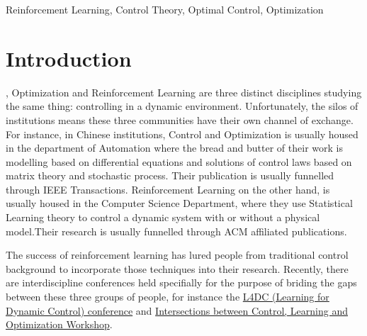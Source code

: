 \documentclass[journal]{IEEEtran}
\begin{document}
\begin{IEEEkeywords}
Reinforcement Learning, Control Theory, Optimal Control, Optimization
\end{IEEEkeywords}
%
\IEEEpeerreviewmaketitle


\section{Introduction}
, Optimization and Reinforcement Learning are three distinct disciplines studying the same thing: controlling in a dynamic environment. Unfortunately, the silos of institutions means these three communities have their own channel of exchange. For instance, in Chinese institutions, Control and Optimization is usually housed in the department of Automation where the bread and butter of their work is modelling based on differential equations and solutions of control laws based on matrix theory and stochastic process. Their publication is usually funnelled through IEEE Transactions. Reinforcement Learning on the other hand, is usually housed in the Computer Science Department, where they use Statistical Learning theory to control a dynamic system with or without a physical model.Their research is usually funnelled through ACM affiliated publications.

The success of reinforcement learning has lured people from traditional control background to incorporate those techniques into their research. Recently, there are interdiscipline conferences held specifially for the purpose of briding the gaps between these three groups of people, for instance the \href{https://l4dc.mit.edu/}{L4DC (Learning for Dynamic Control) conference} and \href{https://www.ipam.ucla.edu/programs/workshops/intersections-between-control-learning-and-optimization/}{Intersections between Control, Learning and Optimization Workshop}.
\end{document}
